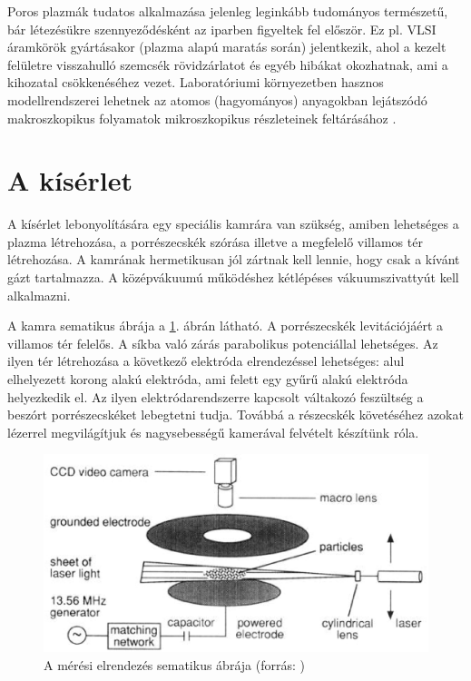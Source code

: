 	 {\color{red}Poros plazmák tudatos alkalmazása jelenleg leginkább
           tudományos természetű, bár létezésükre szennyeződésként
           az iparben figyeltek fel először. Ez pl. VLSI áramkörök gyártásakor
           (plazma alapú maratás során) jelentkezik, ahol a kezelt
           felületre visszahulló szemcsék rövidzárlatot és egyéb
           hibákat okozhatnak, ami a kihozatal csökkenéséhez
	vezet. Laboratóriumi környezetben hasznos modellrendszerei
        lehetnek az atomos (hagyományos) anyagokban lejátszódó
        makroszkopikus folyamatok mikroszkopikus részleteinek
        feltárásához \cite{mikro}. } 

\section{A kísérlet}
	A kísérlet lebonyolítására egy speciális kamrára van szükség, amiben lehetséges a plazma
	létrehozása, a porrészecskék szórása illetve a megfelelő villamos tér létrehozása.
	A kamrának hermetikusan jól zártnak kell lennie, hogy csak a kívánt gázt tartalmazza.
	A középvákuumú működéshez kétlépéses vákuumszivattyút kell alkalmazni.
	
	
	A kamra sematikus ábrája a \ref{fig:meresch}. ábrán látható.
	A porrészecskék levitációjáért a villamos tér felelős. A síkba való zárás parabolikus
	potenciállal lehetséges. Az ilyen tér létrehozása a következő elektróda elrendezéssel lehetséges:
	alul elhelyezett korong alakú elektróda, ami felett egy gyűrű alakú elektróda helyezkedik el.
	Az ilyen elektródarendszerre kapcsolt váltakozó feszültség a beszórt porrészecskéket lebegtetni
	tudja. Továbbá a részecskék követéséhez azokat lézerrel megvilágítjuk és nagysebességű kamerával
	felvételt készítünk róla.
	
	\begin{figure}[H]
		\centering
		\includegraphics[width=0.9\columnwidth]{figures/eps/dust_camera.eps}
		\caption[A mérési elrendezés sematikus ábrája]{A mérési elrendezés sematikus ábrája (forrás: \cite{Merlino2006})} 
		\label{fig:meresch}
	\end{figure}
	
